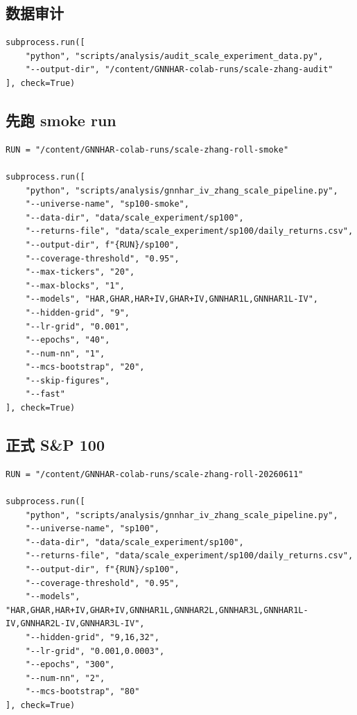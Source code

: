 \documentclass[11pt,a4paper]{ctexart}
\begin{document}
\subsection{数据审计}

\begin{lstlisting}
subprocess.run([
    "python", "scripts/analysis/audit_scale_experiment_data.py",
    "--output-dir", "/content/GNNHAR-colab-runs/scale-zhang-audit"
], check=True)
\end{lstlisting}

\subsection{先跑 smoke run}

\begin{lstlisting}
RUN = "/content/GNNHAR-colab-runs/scale-zhang-roll-smoke"

subprocess.run([
    "python", "scripts/analysis/gnnhar_iv_zhang_scale_pipeline.py",
    "--universe-name", "sp100-smoke",
    "--data-dir", "data/scale_experiment/sp100",
    "--returns-file", "data/scale_experiment/sp100/daily_returns.csv",
    "--output-dir", f"{RUN}/sp100",
    "--coverage-threshold", "0.95",
    "--max-tickers", "20",
    "--max-blocks", "1",
    "--models", "HAR,GHAR,HAR+IV,GHAR+IV,GNNHAR1L,GNNHAR1L-IV",
    "--hidden-grid", "9",
    "--lr-grid", "0.001",
    "--epochs", "40",
    "--num-nn", "1",
    "--mcs-bootstrap", "20",
    "--skip-figures",
    "--fast"
], check=True)
\end{lstlisting}

\subsection{正式 S\&P 100}

\begin{lstlisting}
RUN = "/content/GNNHAR-colab-runs/scale-zhang-roll-20260611"

subprocess.run([
    "python", "scripts/analysis/gnnhar_iv_zhang_scale_pipeline.py",
    "--universe-name", "sp100",
    "--data-dir", "data/scale_experiment/sp100",
    "--returns-file", "data/scale_experiment/sp100/daily_returns.csv",
    "--output-dir", f"{RUN}/sp100",
    "--coverage-threshold", "0.95",
    "--models", "HAR,GHAR,HAR+IV,GHAR+IV,GNNHAR1L,GNNHAR2L,GNNHAR3L,GNNHAR1L-IV,GNNHAR2L-IV,GNNHAR3L-IV",
    "--hidden-grid", "9,16,32",
    "--lr-grid", "0.001,0.0003",
    "--epochs", "300",
    "--num-nn", "2",
    "--mcs-bootstrap", "80"
], check=True)
\end{lstlisting}
\end{document}
